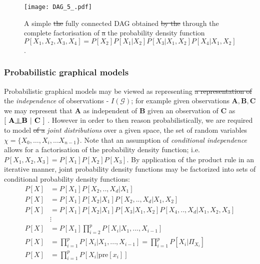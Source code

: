 \documentclass[7pt]{article}
\newcommand{\inperp}{\rotatebox[origin=c]{90}{$\models$}}
\begin{document}
\begin{figure}
	\centering
	\texttt{[image: DAG\_5\_.pdf]}
	\caption{A simple \st{the} fully connected DAG  obtained \st{by the} through the complete factorisation of \st{a} the probability density function  $P[X_1,X_2,X_3,X_4] = P[X_2]P[X_1|X_2]P[X_3|X_1,X_2]P[X_4|X_1,X_2]$.}
	\label{DAG-example}
\end{figure}
\subsubsection{Probabilistic graphical models}
Probabilistic graphical models may be viewed as representing \st{a representation of} the \emph{independence} of observations - $I(\mathcal{G})$; for example given observations $\mathbf{A,B,C}$ we may represent that $\mathbf{A}$ as independent of $\mathbf{B}$ given an observation of $\mathbf{C}$ as $[\hspace{0.05in} \mathbf{A \inperp B \hspace{0.05in} \vert \hspace{0.05in} C \hspace{0.05in}}]$ \cite{pearl1988probabilistic}. However in order to then reason probabilistically, we are required to model \st{of a} \emph{joint distributions} over a given space, the set of random variables $\chi = \{X_0,…,X_i, … X_{n-1}\}$. Note that an assumption of \emph{conditional independence} allows for a factorisation of the probability density function; i.e. $P[X_1,X_2,X_3] = P[X_1] P[X_2] P[X_3]$. By application of the product rule in an iterative manner, joint probability density functions may be factorized into sets of conditional probability density functions:
 \begin{equation}
 \begin{split}
 P[X] & = P[X_1] P[X_2,..,X_d|X_1] \\
 P[X] & = P[X_1] P[X_2|X_1]  P[X_2,..,X_d|X_1,X_2] \\
 P[X] & = P[X_1] P[X_2|X_1]  P[X_3|X_1,X_2]   P[X_4,..,X_d|X_1,X_2,X_3] \\
 & \vdots \\
 P[X] & = P[X_1] \prod_{i=2}^p P[X_i|X_1,...,X_{i-1}] \\
 P[X] & = \prod_{i=1}^p P[X_i|X_1,...,X_{i-1}] = \prod_{i=1}^p P[X_i|\Pi_{X_i}] \\
 P[X] & = \prod_{i=1}^p P[X_i|\text{pre}[x_i]] \\
 \end{split}
 \end{equation}
\end{document}
